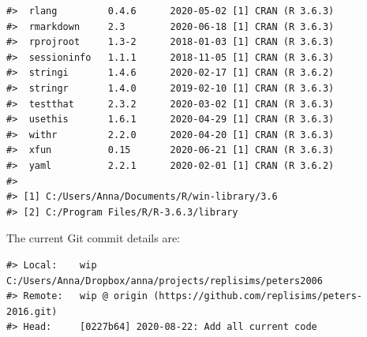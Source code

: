 \documentclass[
  english,
  doc,floatsintext,draftall]{apa6}
\begin{document}
\begin{verbatim}
#>  rlang         0.4.6      2020-05-02 [1] CRAN (R 3.6.3)              
#>  rmarkdown     2.3        2020-06-18 [1] CRAN (R 3.6.3)              
#>  rprojroot     1.3-2      2018-01-03 [1] CRAN (R 3.6.3)              
#>  sessioninfo   1.1.1      2018-11-05 [1] CRAN (R 3.6.3)              
#>  stringi       1.4.6      2020-02-17 [1] CRAN (R 3.6.2)              
#>  stringr       1.4.0      2019-02-10 [1] CRAN (R 3.6.3)              
#>  testthat      2.3.2      2020-03-02 [1] CRAN (R 3.6.3)              
#>  usethis       1.6.1      2020-04-29 [1] CRAN (R 3.6.3)              
#>  withr         2.2.0      2020-04-20 [1] CRAN (R 3.6.3)              
#>  xfun          0.15       2020-06-21 [1] CRAN (R 3.6.3)              
#>  yaml          2.2.1      2020-02-01 [1] CRAN (R 3.6.2)              
#> 
#> [1] C:/Users/Anna/Documents/R/win-library/3.6
#> [2] C:/Program Files/R/R-3.6.3/library
\end{verbatim}

The current Git commit details are:

\begin{verbatim}
#> Local:    wip C:/Users/Anna/Dropbox/anna/projects/replisims/peters2006
#> Remote:   wip @ origin (https://github.com/replisims/peters-2016.git)
#> Head:     [0227b64] 2020-08-22: Add all current code
\end{verbatim}
\end{document}
